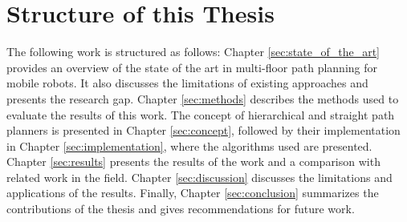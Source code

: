 \section{Structure of this Thesis}
\label{sec:structure}
The following work is structured as follows: Chapter \ref{sec:state_of_the_art} provides an overview of the state of the art in multi-floor path planning for mobile robots. It also discusses the limitations of existing approaches and presents the research gap. Chapter \ref{sec:methods} describes the methods used to evaluate the results of this work. The concept of hierarchical and straight path planners is presented in Chapter \ref{sec:concept}, followed by their implementation in Chapter \ref{sec:implementation}, where the algorithms used are presented. Chapter \ref{sec:results} presents the results of the work and a comparison with related work in the field. Chapter \ref{sec:discussion} discusses the limitations and applications of the results. Finally, Chapter \ref{sec:conclusion} summarizes the contributions of the thesis and gives recommendations for future work.